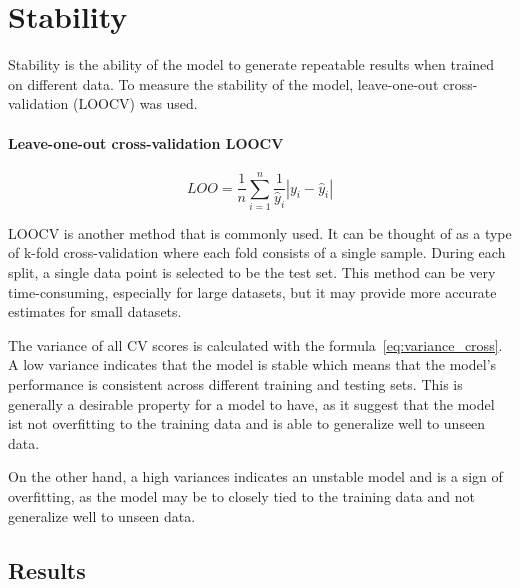 \section{Stability}
Stability is the ability of the model to generate repeatable results when trained on different data. \cite[p. 16]{siebert_constructionqualitymodel_}
To measure the stability of the model, leave-one-out cross-validation (\ac{LOOCV}) was used.


\paragraph*{Leave-one-out cross-validation \ac{LOOCV}}

\begin{equation}
    \label{eq:loo}
    LOO = \frac{1}{n} \sum_{i=1}^{n} \frac{1}{\hat{y}_i} |y_i - \hat{y}_i|
\end{equation}

\ac{LOOCV} is another method that is commonly used. It can be thought of as a type of k-fold cross-validation where each fold consists of a single sample. During each split, a single data point is selected to be the test set. This method can be very time-consuming, especially for large datasets, but it may provide more accurate estimates for small datasets. \cite[p. 257-258]{muller_introductionmachinelearning_2016}

The variance of all \ac{CV} scores is calculated with the formula~\ref{eq:variance_cross}.
A low variance indicates that the model is stable which means that the model's performance is consistent across different training and testing sets. This is generally  a desirable property for a model to have, as it suggest that the model ist not overfitting to the training data and is able to generalize well to unseen data.

On the other hand, a high variances indicates an unstable model and is a sign of overfitting, as the model may be to closely tied to the training data and not generalize well to unseen data.

\subsection{Results}

